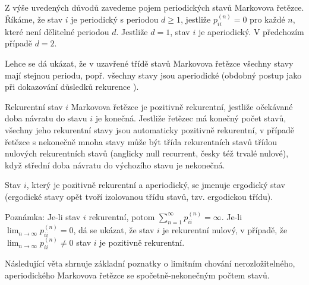 \documentclass[10pt]{article}
\begin{document}
Z výše uvedených důvodů zavedeme pojem periodických stavů Markovova řetězce. Říkáme, že stav $i$ je periodický s periodou $d \geq 1$, jestliže $p_{ii}^{(n)} = 0$ pro každé $n$, které není dělitelné periodou $d$. Jestliže $d=1$, stav $i$ je aperiodický. V předchozím případě $d=2$.

Lehce se dá ukázat, že v uzavřené třídě stavů Markovova řetězce všechny stavy mají stejnou periodu, popř. všechny stavy jsou aperiodické (obdobný postup jako při dokazování důsledků rekurence ).

Rekurentní stav $i$ Markovova řetězce je pozitivně rekurentní, jestliže očekávané doba návratu do stavu $i$ je konečná. Jestliže řetězec má konečný počet stavů, všechny jeho rekurentní stavy jsou automaticky pozitivně rekurentní, v případě řetězce s nekonečně mnoha stavy může být třída rekurentních stavů třídou nulových rekurentních stavů (anglicky null recurrent, česky též trvalé nulové), když střední doba návratu do výchozího stavu je nekonečná.

Stav $i$, který je pozitivně rekurentní a aperiodický, se jmenuje ergodický stav (ergodické stavy opět tvoří izolovanou třídu stavů, tzv. ergodickou třídu).

Poznámka: Je-li stav $i$ rekurentní, potom $\sum_{n=1}^\infty p_{ii}^{(n)} = \infty$. Je-li $\lim_{n \to \infty} p_{ii}^{(n)} = 0$, dá se ukázat, že stav $i$ je rekurentní nulový, v případě, že $\lim_{n \to \infty} p_{ii}^{(n)} \neq 0$ stav $i$ je pozitivně rekurentní.

Následující věta shrnuje základní poznatky o limitním chování nerozložitelného, aperiodického Markovova řetězce se spočetně-nekonečným počtem stavů.
\end{document}
